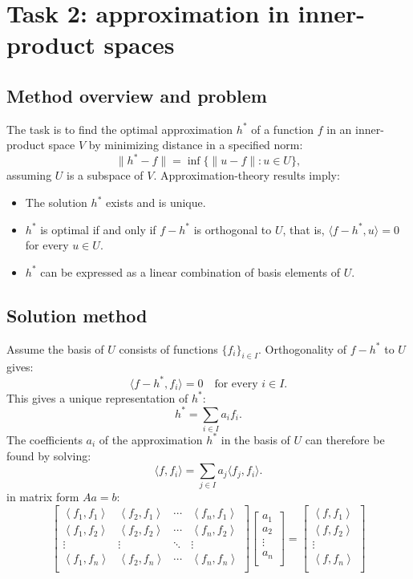 \section{Task 2: approximation in inner-product spaces}
\subsection{Method overview and problem}
The task is to find the optimal approximation \( h^* \) of a function \( f \) in an inner-product space \( V \) by minimizing distance in a specified norm: \[
\|h^* - f\| = \inf \{\|u - f\| : u \in U\},
\] assuming \( U \) is a subspace of \( V \). Approximation-theory results imply:
\begin{itemize}
    \item The solution \( h^* \) exists and is unique.
    \item \( h^* \) is optimal if and only if \( f - h^* \) is orthogonal to \( U \), that is, \( \langle f - h^*, u \rangle = 0 \) for every \( u \in U \).
    \item \( h^* \) can be expressed as a linear combination of basis elements of \( U \).
\end{itemize}
\subsection{Solution method}
Assume the basis of \( U \) consists of functions \( \{f_i\}_{i \in I} \). Orthogonality of \( f - h^* \) to \( U \) gives: \[
\langle f - h^*, f_i \rangle = 0 \quad \text{for every } i \in I.
\] 
This gives a unique representation of \( h^* \):
\[
    h^* = \sum_{i \in I} a_i f_i.
\] 
The coefficients \( a_i \) of the approximation \( h^* \) in the basis of \( U \) can therefore be found by solving:
\[
\langle f, f_i \rangle = \sum_{j \in I} a_j \langle f_j, f_i \rangle.
\] 
in matrix form $Aa = b$:
\[
\begin{bmatrix} 
\left<f_1, f_1\right> & \left<f_2, f_1\right> & \cdots & \left<f_n, f_1\right> \\ 
\left<f_1, f_2\right> & \left<f_2, f_2\right> & \cdots & \left<f_n, f_2\right> \\ 
\vdots & \vdots & \ddots & \vdots \\ 
\left<f_1, f_n\right> & \left<f_2, f_n\right> & \cdots & \left<f_n, f_n\right> \\ 
\end{bmatrix} 
\begin{bmatrix} 
a_1 \\ a_2 \\ \vdots \\ a_n \\ 
\end{bmatrix} = 
\begin{bmatrix} 
\left<f, f_1\right> \\ 
\left<f, f_2\right> \\ 
\vdots \\ 
\left<f, f_n\right> \\ 
\end{bmatrix}
\]
